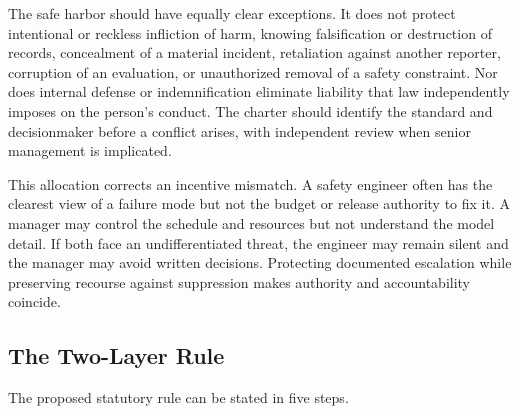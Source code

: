The safe harbor should have equally clear exceptions. It does not protect intentional or reckless infliction of harm, knowing falsification or destruction of records, concealment of a material incident, retaliation against another reporter, corruption of an evaluation, or unauthorized removal of a safety constraint. Nor does internal defense or indemnification eliminate liability that law independently imposes on the person's conduct. The charter should identify the standard and decisionmaker before a conflict arises, with independent review when senior management is implicated.

This allocation corrects an incentive mismatch. A safety engineer often has the clearest view of a failure mode but not the budget or release authority to fix it. A manager may control the schedule and resources but not understand the model detail. If both face an undifferentiated threat, the engineer may remain silent and the manager may avoid written decisions. Protecting documented escalation while preserving recourse against suppression makes authority and accountability coincide.

\subsection{The Two-Layer Rule}

The proposed statutory rule can be stated in five steps.

